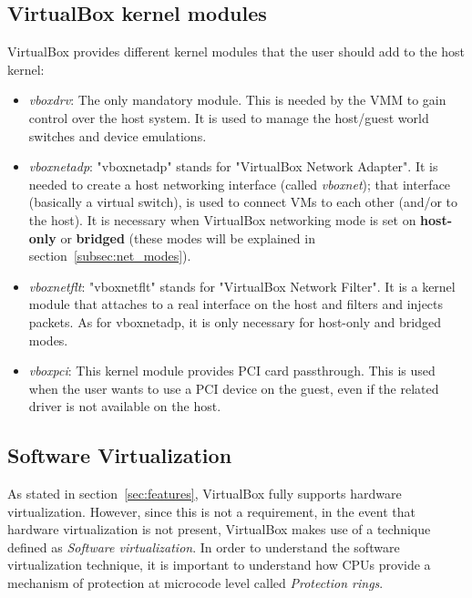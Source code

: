 \documentclass[a4paper, 12pt, titlepage]{report}
\begin{document}
\subsection{VirtualBox kernel modules} \label{subsec:kern_modules}
VirtualBox provides different kernel modules that the user should add to the host kernel:
\begin{itemize}
\item \textit{vboxdrv}: The only mandatory module. This is needed by the VMM to gain control over the host system. It is used to manage the host/guest world switches and device emulations.
\item \textit{vboxnetadp}: "vboxnetadp" stands for "VirtualBox Network Adapter". It is needed to create a host networking interface (called \textit{vboxnet}); that interface (basically a virtual switch), is used to connect VMs to each other (and/or to the host). It is necessary when VirtualBox networking mode is set on \textbf{host-only} or \textbf{bridged} (these modes will be explained in section~\ref{subsec:net_modes}).
\item \textit{vboxnetflt}: "vboxnetflt" stands for "VirtualBox Network Filter". It is a kernel module that attaches to a real interface on the host and filters and injects packets. As for vboxnetadp, it is only necessary for host-only and bridged modes.
\item \textit{vboxpci}: This kernel module provides PCI card passthrough. This is used when the user wants to use a PCI device on the guest, even if the related driver is not available on the host.
\end{itemize}
\subsection{Software Virtualization}
As stated in section~\ref{sec:features}, VirtualBox fully supports hardware virtualization. However, since this is not a requirement, in the event that hardware virtualization is not present, VirtualBox makes use of a technique defined as \textit{Software virtualization}.
In order to understand the software virtualization technique, it is important to understand how CPUs provide a mechanism of protection at microcode level called \textit{Protection rings}.
\end{document}
